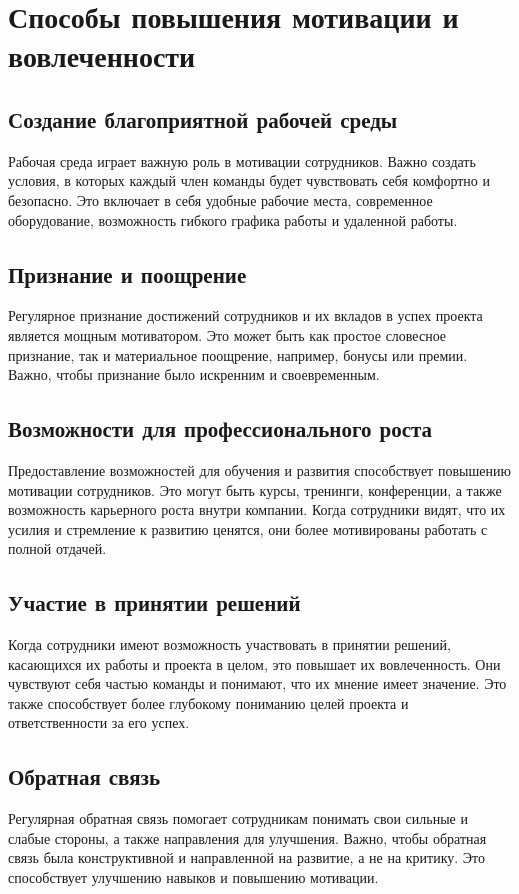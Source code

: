     \section{Способы повышения мотивации и вовлеченности}

    \subsection*{Создание благоприятной рабочей среды}
    Рабочая среда играет важную роль в мотивации сотрудников. Важно создать условия, в которых каждый член команды будет чувствовать себя комфортно и безопасно. Это включает в себя удобные рабочие места, современное оборудование, возможность гибкого графика работы и удаленной работы.

    \subsection*{Признание и поощрение}
    Регулярное признание достижений сотрудников и их вкладов в успех проекта является мощным мотиватором. Это может быть как простое словесное признание, так и материальное поощрение, например, бонусы или премии. Важно, чтобы признание было искренним и своевременным.

    \subsection*{Возможности для профессионального роста}
    Предоставление возможностей для обучения и развития способствует повышению мотивации сотрудников. Это могут быть курсы, тренинги, конференции, а также возможность карьерного роста внутри компании. Когда сотрудники видят, что их усилия и стремление к развитию ценятся, они более мотивированы работать с полной отдачей.

    \subsection*{Участие в принятии решений}
    Когда сотрудники имеют возможность участвовать в принятии решений, касающихся их работы и проекта в целом, это повышает их вовлеченность. Они чувствуют себя частью команды и понимают, что их мнение имеет значение. Это также способствует более глубокому пониманию целей проекта и ответственности за его успех.

    \subsection*{Обратная связь}
    Регулярная обратная связь помогает сотрудникам понимать свои сильные и слабые стороны, а также направления для улучшения. Важно, чтобы обратная связь была конструктивной и направленной на развитие, а не на критику. Это способствует улучшению навыков и повышению мотивации.

